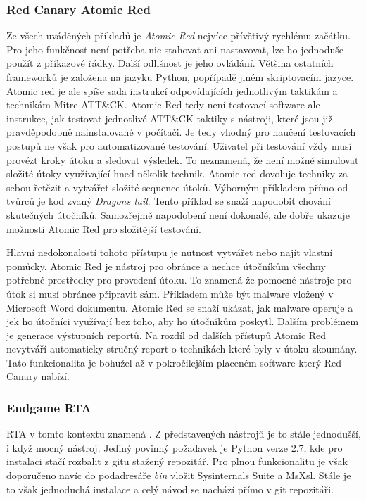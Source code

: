 \subsubsection{Red Canary Atomic Red}
Ze všech uváděných příkladů je \textit{Atomic Red} nejvíce přívětivý rychlému začátku.
Pro jeho funkčnost není potřeba nic stahovat ani nastavovat, lze ho jednoduše použít z příkazové řádky\cite{redcanary_atomic_red}.
Další odlišnost je jeho ovládání.
Většina ostatních frameworků je založena na jazyku Python, popřípadě jiném skriptovacím jazyce.
Atomic red je ale spíše sada instrukcí odpovídajících jednotlivým taktikám a technikám Mitre ATT\&CK\@.
Atomic Red tedy není testovací software ale instrukce, jak testovat jednotlivé ATT\&CK taktiky s nástroji, které jsou již pravděpodobně nainstalované v počítači.
Je tedy vhodný pro naučení testovacích postupů ne však pro automatizované testování.
Uživatel při testování vždy musí provézt kroky útoku a sledovat výsledek.
To neznamená, že není možné simulovat složité útoky využívající hned několik technik.
Atomic red dovoluje techniky za sebou řetězit a vytvářet složité sequence útoků.
Výborným příkladem přímo od tvůrců je kod zvaný \textit{Dragons tail}\cite{redcanary_dragons_tail}.
Tento příklad se snaží napodobit chování skutečných útočníků.
Samozřejmě napodobení není dokonalé, ale dobře ukazuje možnosti Atomic Red pro složitější testování.\cite{csoonline_4_testing_frameworks}

Hlavní nedokonalostí tohoto přístupu je nutnost vytvářet nebo najít vlastní pomůcky.
Atomic Red je nástroj pro obránce a nechce útočníkům všechny potřebné prostředky pro provedení útoku.
To znamená že pomocné nástroje pro útok si musí obránce připravit sám.
Příkladem může být malware vložený v Microsoft Word dokumentu.
Atomic Red se snaží ukázat, jak malware operuje a jek ho útočníci využívají bez toho, aby ho útočníkům poskytl.
Dalším problémem je generace výstupních reportů.
Na rozdíl od dalších přístupů Atomic Red nevytváří automaticky stručný report o technikách které byly v útoku zkoumány.
Tato funkcionalita je bohužel až v pokročilejším placeném software který Red Canary nabízí.\cite{csoonline_4_testing_frameworks}


\subsubsection{Endgame RTA}
\ac{RTA} v tomto kontextu znamená .
Z představených nástrojů je to stále jednodušší, i když mocný nástroj.
Jediný povinný požadavek je Python verze 2.7, kde pro instalaci stačí rozbalit z gitu stažený repozitář.
Pro plnou funkcionalitu je však doporučeno navíc do podadresáře \textit{bin} vložit Sysinternals Suite a MsXsl.
Stále je to však jednoduchá instalace a celý návod se nachází přímo v git repozitáři.\cite{endgame_rta}


